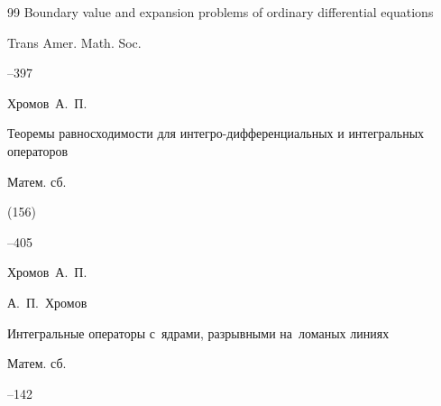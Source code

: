 \begin{thebibliography}{99}
\paper  Boundary value and expansion problems of ordinary differential equations

\jour Trans Amer. Math. Soc.




--397





\by Хромов~А.~П.

\paper Теоремы равносходимости для интегро-дифференциальных и интегральных операторов

\jour Матем. сб.


(156)


--405




















\by Хромов~А.~П.

\by А.~П.~Хромов

\paper Интегральные операторы с~ядрами, разрывными на~ломаных линиях

\jour Матем. сб.




--142



\end{thebibliography}
